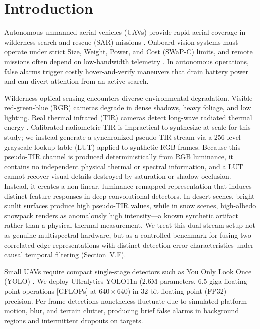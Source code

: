 \documentclass[conference]{IEEEtran}
\begin{document}
\section{Introduction}

Autonomous unmanned aerial vehicles (UAVs) provide rapid aerial coverage in wilderness search and rescue (SAR) missions \cite{rudol2008human,silvagni2017multipurpose}. Onboard vision systems must operate under strict Size, Weight, Power, and Cost (SWaP-C) limits, and remote missions often depend on low-bandwidth telemetry \cite{kyrkou2021emergencynet}. In autonomous operations, false alarms trigger costly hover-and-verify maneuvers that drain battery power and can divert attention from an active search.

Wilderness optical sensing encounters diverse environmental degradation. Visible red-green-blue (RGB) cameras degrade in dense shadows, heavy foliage, and low lighting. Real thermal infrared (TIR) cameras detect long-wave radiated thermal energy \cite{hwang2015multispectral,jia2021llvip}. Calibrated radiometric TIR is impractical to synthesize at scale for this study; we instead generate a synchronized pseudo-TIR stream via a 256-level grayscale lookup table (LUT) applied to synthetic RGB frames. Because this pseudo-TIR channel is produced deterministically from RGB luminance, it contains no independent physical thermal or spectral information, and a LUT cannot recover visual details destroyed by saturation or shadow occlusion. Instead, it creates a non-linear, luminance-remapped representation that induces distinct feature responses in deep convolutional detectors. In desert scenes, bright sunlit surfaces produce high pseudo-TIR values, while in snow scenes, high-albedo snowpack renders as anomalously high intensity—a known synthetic artifact rather than a physical thermal measurement. We treat this dual-stream setup not as genuine multispectral hardware, but as a controlled benchmark for fusing two correlated edge representations with distinct detection error characteristics under causal temporal filtering (Section~V.F).

Small UAVs require compact single-stage detectors such as You Only Look Once (YOLO) \cite{redmon2016you}. We deploy Ultralytics YOLO11n \cite{jocher2024yolo11} (2.6M parameters, 6.5 giga floating-point operations [GFLOPs] at $640 \times 640$) in 32-bit floating-point (FP32) precision. Per-frame detections nonetheless fluctuate due to simulated platform motion, blur, and terrain clutter, producing brief false alarms in background regions and intermittent dropouts on targets.
\end{document}
